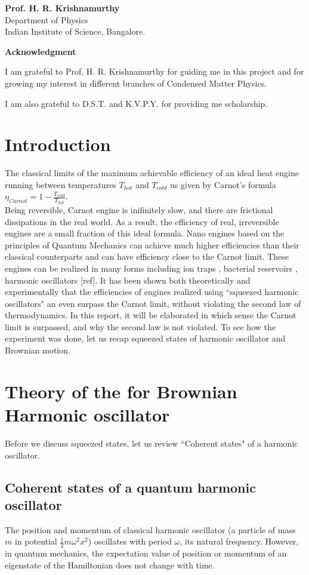 \documentclass[12pt, twoside]{article}
\begin{document}
\textbf{Prof. H. R. Krishnamurthy}\\
Department of Physics\\
Indian Institute of Science, Bangalore.
\newpage
\begin{center}
	\textbf{Acknowledgment}
\end{center}

I am grateful to Prof. H. R. Krishnamurthy for guiding me in this project and for growing my interest in different branches of Condensed Matter Physics. 

I am also grateful to D.S.T. and K.V.P.Y. for providing me scholarship.
\tableofcontents

\section{Introduction}
The classical limits of the maximum achievable efficiency of an ideal heat engine running between temperatures $T_{hot}$ and $T_{cold}$ us given by Carnot's formula $\eta_{Carnot} = 1 - \frac{T_{cold}}{T_{hot}}$.\\
Being reversible, Carnot engine is inifinitely slow, and there are frictional dissipations in the real world. As a result, the efficiency of real, irreversible engines are a small fraction of this ideal formula.
Nano engines based on the principles of Quantum Mechanics can achieve much higher efficiencies than their classical counterparts \cite{Millen_2016} and can have efficiency close to the Carnot limit.
These engines can be realized in many forms including ion traps \cite{ion_trap_abah}, bacterial reservoirs \cite{bacterial_reservoir}, harmonic oscillators [ref].
It has been shown both theoretically \cite{abah_et_al} and experimentally \cite{klaers} that the efficiencies of engines realized using ``squeezed harmonic oscillators" an even surpass the Carnot limit, without violating the second law of thermodynamics. In this report, it will be elaborated in which sense the Carnot limit is surpassed, and why the second law is not violated.
To see how the experiment \cite{klaers} was done, let us recap squeezed states of harmonic oscillator and Brownian motion.
\section{Theory of the for Brownian Harmonic oscillator}

Before we discuss squeezed states, let us review ``Coherent states" of a harmonic oscillator.
\subsection{Coherent states of a quantum harmonic oscillator}
The position and momentum of classical harmonic oscillator (a particle of mass $m$ in potential $\frac{1}{2}m\omega^2x^2$)  oscillates with period $\omega$, its natural frequency.
However, in quantum mechanics, the expectation value of position or momentum of an eigenstate of the Hamiltonian does not change with time.
\end{document}
